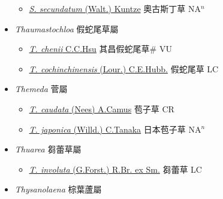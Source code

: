 \begin{itemize}
  \begin{itemize}
        \item[] \href{http://www.theplantlist.org/tpl1.1/search?q=Stenotaphrum+secundatum}{\textit{S. secundatum} (Walt.) Kuntze}   奧古斯丁草 NA$^n$
  \end{itemize}
 \item[] \textit{Thaumastochloa} 假蛇尾草屬
                    
  \begin{itemize}
        \item[] \href{http://www.theplantlist.org/tpl1.1/search?q=Thaumastochloa+chenii}{\textit{T. chenii} C.C.Hsu}   其昌假蛇尾草\# VU
        \item[] \href{http://www.theplantlist.org/tpl1.1/search?q=Thaumastochloa+cochinchinensis}{\textit{T. cochinchinensis} (Lour.) C.E.Hubb.}   假蛇尾草 LC
  \end{itemize}
 \item[] \textit{Themeda} 菅屬
                    
  \begin{itemize}
        \item[] \href{http://www.theplantlist.org/tpl1.1/search?q=Themeda+caudata}{\textit{T. caudata} (Nees) A.Camus}   苞子草 CR
        \item[] \href{http://www.theplantlist.org/tpl1.1/search?q=Themeda+japonica}{\textit{T. japonica} (Willd.) C.Tanaka}   日本苞子草 NA$^n$
  \end{itemize}
 \item[] \textit{Thuarea} 芻蕾草屬
                    
  \begin{itemize}
        \item[] \href{http://www.theplantlist.org/tpl1.1/search?q=Thuarea+involuta}{\textit{T. involuta} (G.Forst.) R.Br. ex Sm.}   芻蕾草 LC
  \end{itemize}
 \item[] \textit{Thysanolaena} 棕葉蘆屬
                    

\end{itemize}
